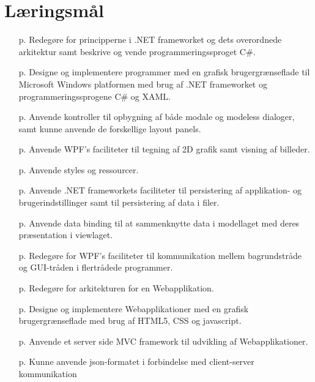 \section{Læringsmål}

\begin{itemize}
	\item [p.\pageref{sec:spm1}] Redegøre for principperne i .NET frameworket og dets overordnede arkitektur samt beskrive og vende programmeringssproget C\#.

	\item [p.\pageref{sec:spm2}] Designe og implementere programmer med en grafisk brugergrænseflade til Microsoft Windows platformen med brug af .NET frameworket og programmeringssprogene C\# og XAML.

	\item [p.\pageref{sec:spm3}] Anvende kontroller til opbygning af både modale og modeless dialoger, samt kunne anvende de forskellige layout panels.

	\item [p.\pageref{sec:spm4}] Anvende WPF's faciliteter til tegning af 2D grafik samt visning af billeder.
	
	\item [p.\pageref{sec:spm5}] Anvende styles og ressourcer.
	
	\item [p.\pageref{sec:spm6}] Anvende .NET frameworkets faciliteter til persistering af applikation- og brugerindstillinger samt til persistering af data i filer.
	
	\item [p.\pageref{sec:spm7}] Anvende data binding til at sammenknytte data i modellaget med deres præsentation i viewlaget.
	
	\item [p.\pageref{sec:spm8}] Redegøre for WPF's faciliteter til kommunikation mellem bagrundstråde og GUI-tråden i flertrådede programmer.
	
	\item [p.\pageref{sec:spm9}] Redegøre for arkitekturen for en Webapplikation.
	
	\item [p.\pageref{sec:spm10}] Designe og implementere Webapplikationer med en grafisk brugergrænseflade med brug af HTML5, CSS og javascript.
	
	\item [p.\pageref{sec:spm12}] Anvende et server side MVC framework til udvikling af Webapplikationer.
	
	\item [p.\pageref{sec:spm11}] Kunne anvende json-formatet i forbindelse med client-server kommunikation	
\end{itemize}